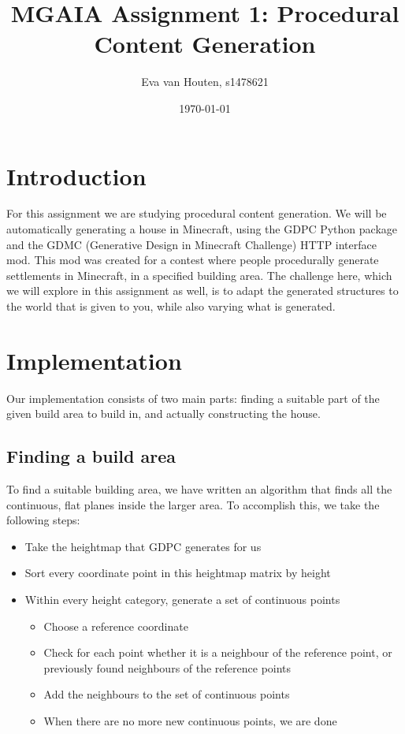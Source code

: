 \documentclass[10pt]{article}
\title{MGAIA Assignment 1: Procedural Content Generation}
\date{\today}
\author{Eva van Houten, s1478621}
\begin{document}
\maketitle

\section{Introduction}
For this assignment we are studying procedural content generation. We will be automatically generating a house in Minecraft, using the GDPC Python package and the GDMC (Generative Design in Minecraft Challenge) HTTP interface mod. This mod was created for a contest where people procedurally generate settlements in Minecraft, in a specified building area. The challenge here, which we will explore in this assignment as well, is to adapt the generated structures to the world that is given to you, while also varying what is generated. %

\section{Implementation}
Our implementation consists of two main parts: finding a suitable part of the given build area to build in, and actually constructing the house.
\subsection{Finding a build area}
To find a suitable building area, we have written an algorithm that finds all the continuous, flat planes inside the larger area. To accomplish this, we take the following steps:
\begin{itemize}
    \item Take the heightmap that GDPC generates for us
    \item Sort every coordinate point in this heightmap matrix by height
    \item Within every height category, generate a set of continuous points
          \begin{itemize}
              \item Choose a reference coordinate
              \item Check for each point whether it is a neighbour of the reference point, or previously found neighbours of the reference points
              \item Add the neighbours to the set of continuous points
              \item When there are no more new continuous points, we are done
          \end{itemize}
\end{itemize}
\end{document}
